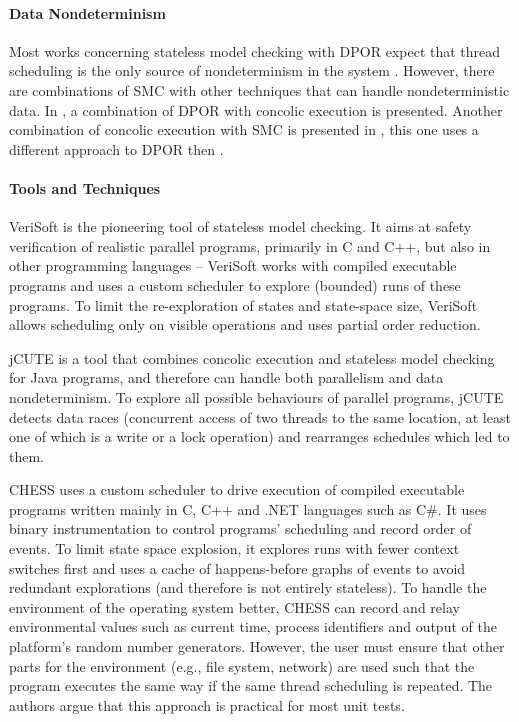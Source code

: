 \paragraph{Data Nondeterminism}

Most works concerning stateless model checking with DPOR expect that thread
scheduling is the only source of nondeterminism in the system .
However, there are combinations of SMC with other techniques that can handle
nondeterministic data.
In , a combination of DPOR with concolic execution is presented.
Another combination of concolic execution with SMC is presented in , this one uses a different approach to DPOR then .

\paragraph{Tools and Techniques}

VeriSoft  is the pioneering tool of stateless model checking.
It aims at safety verification of realistic parallel programs, primarily in C and C++, but also in other programming languages -- VeriSoft works with compiled executable programs and uses a custom scheduler to explore (bounded) runs of these programs.
To limit the re-exploration of states and state-space size, VeriSoft allows scheduling only on visible operations and uses partial order reduction.

jCUTE  is a tool that combines concolic execution and stateless model checking for Java programs, and therefore can handle both parallelism and data nondeterminism.
To explore all possible behaviours of parallel programs, jCUTE detects data races (concurrent access of two threads to the same location, at least one of which is a write or a lock operation) and rearranges schedules which led to them.

CHESS  uses a custom scheduler to drive execution of compiled executable programs written mainly in C, C++ and .NET languages such as C\#.
It uses binary instrumentation to control programs' scheduling and record order of events.
To limit state space explosion, it explores runs with fewer context switches first and uses a cache of happens-before graphs of events to avoid redundant explorations (and therefore is not entirely stateless).
To handle the environment of the operating system better, CHESS can record and relay environmental values such as current time, process identifiers and output of the platform's random number generators.
However, the user must ensure that other parts for the environment (e.g., file system, network) are used such that the program executes the same way if the same thread scheduling is repeated.
The authors argue that this approach is practical for most unit tests.

